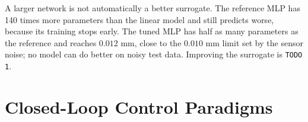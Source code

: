 \documentclass[11pt,a4paper]{article}
\begin{document}
\begin{table}[h!]
\centering
{}
\caption{Holdout validation on the 300 test shots of the notebook dataset (1,500 shots over $\pm 3.0\text{ A}$, \texttt{random\_state=42}).}
\label{tab:surrogate_perf}
\end{table}

\begin{infobox}
A larger network is not automatically a better surrogate. The reference MLP has 140 times more parameters than the linear model and still predicts worse, because its training stops early. The tuned MLP has half as many parameters as the reference and reaches $0.012\text{ mm}$, close to the $0.010\text{ mm}$ limit set by the sensor noise; no model can do better on noisy test data. Improving the surrogate is \texttt{TODO 1}.
\end{infobox}


\section{Closed-Loop Control Paradigms}
\end{document}
